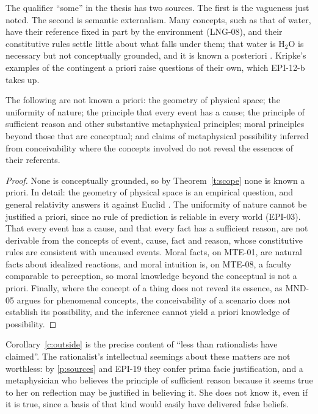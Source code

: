 \documentclass{situationist-preprint}
\begin{document}
The qualifier \enquote{some} in the thesis has two sources. The first is the vagueness just noted. The second is semantic externalism. Many concepts, such as that of water, have their reference fixed in part by the environment (LNG-08), and their constitutive rules settle little about what falls under them; that water is H$_2$O is necessary but not conceptually grounded, and it is known a posteriori \citep{Kripke1980}. Kripke's examples of the contingent a priori raise questions of their own, which EPI-12-b takes up.

\begin{corollary}\label{c:outside}
The following are not known a priori: the geometry of physical space; the uniformity of nature; the principle that every event has a cause; the principle of sufficient reason and other substantive metaphysical principles; moral principles beyond those that are conceptual; and claims of metaphysical possibility inferred from conceivability where the concepts involved do not reveal the essences of their referents.
\end{corollary}

\begin{proof}
None is conceptually grounded, so by Theorem~\ref{t:scope} none is known a priori. In detail: the geometry of physical space is an empirical question, and general relativity answers it against Euclid \citep{Reichenbach1958,Putnam1962}. The uniformity of nature cannot be justified a priori, since no rule of prediction is reliable in every world (EPI-03). That every event has a cause, and that every fact has a sufficient reason, are not derivable from the concepts of event, cause, fact and reason, whose constitutive rules are consistent with uncaused events. Moral facts, on MTE-01, are natural facts about idealized reactions, and moral intuition is, on MTE-08, a faculty comparable to perception, so moral knowledge beyond the conceptual is not a priori. Finally, where the concept of a thing does not reveal its essence, as MND-05 argues for phenomenal concepts, the conceivability of a scenario does not establish its possibility, and the inference cannot yield a priori knowledge of possibility.
\end{proof}

Corollary~\ref{c:outside} is the precise content of \enquote{less than rationalists have claimed}. The rationalist's intellectual seemings about these matters are not worthless: by \ref{p:sources} and EPI-19 they confer prima facie justification, and a metaphysician who believes the principle of sufficient reason because it seems true to her on reflection may be justified in believing it. She does not know it, even if it is true, since a basis of that kind would easily have delivered false beliefs.
\end{document}
